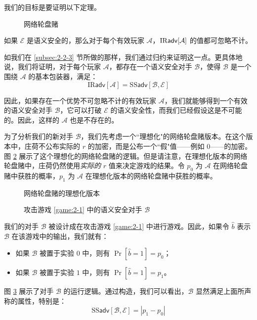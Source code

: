 我们的目标是要证明以下定理。

\begin{figure}
	\centering
	
	\caption{网络轮盘赌}
	\label{fig:2-2}
\end{figure}

\begin{theorem}\label{theo:2-9}
如果 $\mathcal{E}$ 是语义安全的，那么对于每个有效玩家 $\mathcal{A}$，${\rm IR\mathsf{adv}}[\mathcal{A}]$ 的值都可忽略不计。
\end{theorem}

\vspace{5pt}

如我们在 \ref{subsec:2-2-3} 节所做的那样，我们通过归约来证明这一点。更具体地说，我们将证明，对于每个玩家 $\mathcal{A}$，都存在一个语义安全对手 $\mathcal{B}$，使得 $\mathcal{B}$ 是一个围绕 $\mathcal{A}$ 的基本包装器，满足：
\begin{equation}\label{eq:2-7}
\mathrm{IR}\mathsf{adv}[\mathcal{A}]
=
\mathrm{SS}\mathsf{adv}[\mathcal{B},\mathcal{E}]
\end{equation}

因此，如果存在一个优势不可忽略不计的有效玩家 $\mathcal{A}$，我们就能够得到一个有效的语义安全对手 $\mathcal{B}$，它可以打破 $\mathcal{E}$ 的语义安全性，而我们已经假设这是不可能的。因此，这样的 $\mathcal{A}$ 也是不存在的。

为了分析我们的新对手 $\mathcal{B}$，我们先考虑一个``理想化"的网络轮盘赌版本。在这个版本中，庄荷不公布实际的 $r$ 的加密，而是公布一个``假"值——例如 $0$——的加密。图 \ref{fig:2-3} 展示了这个理想化的网络轮盘赌的逻辑。但是请注意，在理想化版本的网络轮盘赌中，庄荷仍然使用\emph{实际的} $r$ 值来决定游戏的结果。令 $p_0$ 为 $\mathcal{A}$ 在网络轮盘赌中获胜的概率，$p_1$ 为 $\mathcal{A}$ 在理想化版本的网络轮盘赌中获胜的概率。

\begin{figure}
	\centering
	
	\caption{网络轮盘赌的理想化版本}
	\label{fig:2-3}
\end{figure}

\begin{figure}
	\centering
	
	\caption{攻击游戏 \ref{game:2-1} 中的语义安全对手 $\mathcal{B}$}
	\label{fig:2-4}
\end{figure}

我们的对手 $\mathcal{B}$ 被设计成在攻击游戏 \ref{game:2-1} 中进行游戏。因此，如果令 $\hat b$ 表示 $\mathcal{B}$ 在该游戏中的输出，我们就有：
\begin{itemize}
	\item 如果 $\mathcal{B}$ 被置于实验 $0$ 中，则有 $\Pr[\hat b=1]=p_0$；
	\item 如果 $\mathcal{B}$ 被置于实验 $1$ 中，则有 $\Pr[\hat b=1]=p_1$。
\end{itemize}
图 \ref{fig:2-4} 展示了对手 $\mathcal{B}$ 的运行逻辑。通过构造，我们可以看出，$\mathcal{B}$ 显然满足上面所声称的属性，特别是：
\begin{equation}\label{eq:2-8}
\mathrm{SS}\mathsf{adv}[\mathcal{B},\mathcal{E}]
=
|p_1-p_0|
\end{equation}

